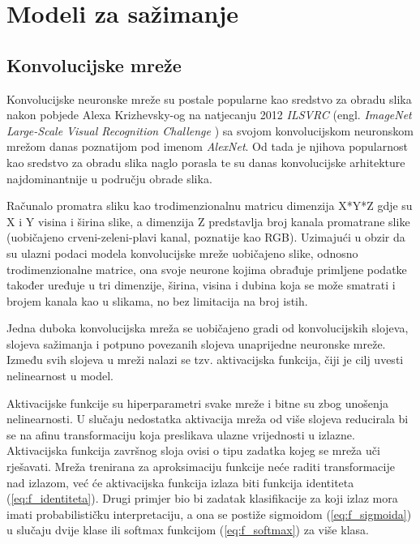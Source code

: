 \documentclass[times, utf8, proizvoljni, numeric]{fer}
\begin{document}
\chapter{Modeli za sažimanje}

\section{Konvolucijske mreže}

Konvolucijske neuronske mreže su postale popularne kao sredstvo za obradu slika nakon pobjede Alexa Krizhevsky-og na natjecanju 2012 \textit{ILSVRC} (engl. \textit{ImageNet Large-Scale Visual Recognition Challenge} \cite{ILSVRC15}) sa svojom konvolucijskom neuronskom mrežom danas poznatijom pod imenom \textit{AlexNet}. Od tada je njihova popularnost kao sredstvo za obradu slika naglo porasla te su danas konvolucijske arhitekture najdominantnije u području obrade slika.

Računalo promatra sliku kao trodimenzionalnu matricu dimenzija X*Y*Z gdje su X i Y visina i širina slike, a dimenzija Z predstavlja broj kanala promatrane slike (uobičajeno crveni-zeleni-plavi kanal, poznatije kao RGB). Uzimajući u obzir da su ulazni podaci modela konvolucijske mreže uobičajeno slike, odnosno trodimenzionalne matrice, ona svoje neurone kojima obrađuje primljene podatke također uređuje u tri dimenzije, širina, visina i dubina koja se može smatrati i brojem kanala kao u slikama, no bez limitacija na broj istih.

Jedna duboka konvolucijska mreža se uobičajeno gradi od konvolucijskih slojeva, slojeva sažimanja i potpuno povezanih slojeva unaprijedne neuronske mreže. Između svih slojeva u mreži nalazi se tzv. aktivacijska funkcija, čiji je cilj uvesti nelinearnost u model.

Aktivacijske funkcije su hiperparametri svake mreže i bitne su zbog unošenja nelinearnosti. U slučaju nedostatka aktivacija mreža od više slojeva reducirala bi se na afinu transformaciju koja preslikava ulazne vrijednosti u izlazne.  Aktivacijska funkcija završnog sloja ovisi o tipu zadatka kojeg se mreža uči rješavati. Mreža trenirana za aproksimaciju funkcije neće raditi transformacije nad izlazom, već će aktivacijska funkcija izlaza biti funkcija identiteta (\ref{eq:f_identiteta}). Drugi primjer bio bi zadatak klasifikacije za koji izlaz mora imati probabilističku interpretaciju, a ona se postiže sigmoidom (\ref{eq:f_sigmoida}) u slučaju dvije klase ili softmax funkcijom (\ref{eq:f_softmax}) za više klasa. 
\end{document}
